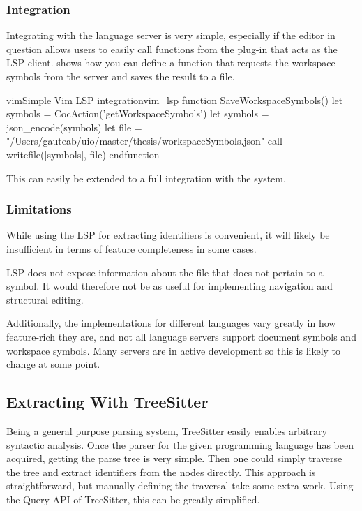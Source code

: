\documentclass[../thesis.tex]{subfiles}
\begin{document}
\subsubsection{Integration}%
Integrating with the language server is very simple, especially if the editor in question allows users to easily
call functions from the plug-in that acts as the LSP client.
 shows how you can define a function that requests the workspace symbols from the server and saves the result
to a file.
\begin{code}{vim}{Simple Vim LSP integration}{vim_lsp}
function SaveWorkspaceSymbols()
    let symbols = CocAction('getWorkspaceSymbols')
    let symbols = json_encode(symbols)
    let file = "/Users/gauteab/uio/master/thesis/workspaceSymbols.json"
    call writefile([symbols], file)
endfunction
\end{code}
This can easily be extended to a full integration with the system.

\subsubsection{Limitations}
While using the LSP for extracting identifiers is convenient, it will likely be insufficient in terms of feature completeness in some cases.

LSP does not expose information about the file that does not pertain to a symbol.
It would therefore not be as useful for implementing navigation and structural editing.

Additionally, the implementations for different languages vary greatly in how feature-rich they are, and not all language servers support document symbols and workspace symbols.
Many servers are in active development so this is likely to change at some point.



\subsection{Extracting With TreeSitter}
Being a general purpose parsing system, TreeSitter easily enables arbitrary syntactic analysis.
Once the parser for the given programming language has been acquired, getting the parse tree
is very simple.
Then one could simply traverse the tree and extract identifiers from the nodes directly.
This approach is straightforward, but manually defining the traversal take some extra work.
Using the Query API of TreeSitter, this can be greatly simplified.
\end{document}
